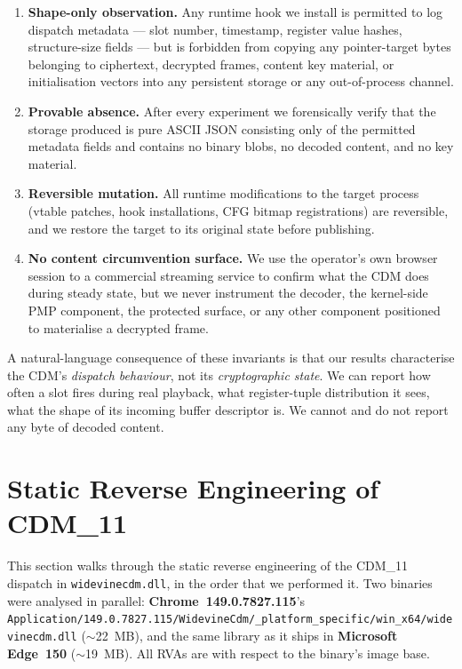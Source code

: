 \documentclass[11pt,letterpaper]{article}
\begin{document}
\begin{enumerate}[itemsep=2pt,topsep=2pt]
  \item \textbf{Shape-only observation.}  Any runtime hook we install
        is permitted to log dispatch metadata --- slot number,
        timestamp, register value hashes, structure-size fields ---
        but is forbidden from copying any pointer-target bytes
        belonging to ciphertext, decrypted frames, content key
        material, or initialisation vectors into any persistent
        storage or any out-of-process channel.
  \item \textbf{Provable absence.}  After every experiment we
        forensically verify that the storage produced is pure ASCII
        JSON consisting only of the permitted metadata fields and
        contains no binary blobs, no decoded content, and no key
        material.
  \item \textbf{Reversible mutation.}  All runtime modifications to
        the target process (vtable patches, hook installations, CFG
        bitmap registrations) are reversible, and we restore the
        target to its original state before publishing.
  \item \textbf{No content circumvention surface.}  We use the
        operator's own browser session to a commercial streaming
        service to confirm what the CDM does during steady state, but
        we never instrument the decoder, the kernel-side PMP
        component, the protected surface, or any other component
        positioned to materialise a decrypted frame.
\end{enumerate}

A natural-language consequence of these invariants is that our results
characterise the CDM's \emph{dispatch behaviour}, not its
\emph{cryptographic state}.  We can report how often a slot fires
during real playback, what register-tuple distribution it sees, what
the shape of its incoming buffer descriptor is.  We cannot and do not
report any byte of decoded content.

\section{Static Reverse Engineering of CDM\_11}
\label{sec:static}

This section walks through the static reverse engineering of the
CDM\_11 dispatch in \texttt{widevinecdm.dll}, in the order that we
performed it.  Two binaries were analysed in parallel:
\textbf{Chrome~149.0.7827.115}'s
\texttt{Application/149.0.7827.115/WidevineCdm/\_platform\_specific/win\_x64/widevinecdm.dll}
($\sim$22~MB), and the same library as it ships in
\textbf{Microsoft Edge~150} ($\sim$19~MB).  All RVAs are with respect
to the binary's image base.
\end{document}
